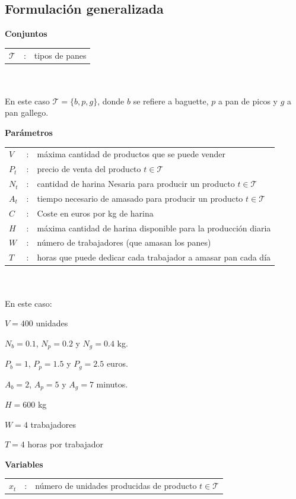 \subsection{Formulación generalizada}

\textbf{Conjuntos}
\

\begin{tabular}{l c l}
    $\mathcal{T}$  & : & tipos de panes \\
\end{tabular}
\\
\\
En este caso $\mathcal{T} = \{b, p, g\}$, donde $b$ se refiere a baguette, $p$ a pan de picos y $g$ a pan gallego.

\textbf{Parámetros}

\begin{tabular}{l c l}
    $V$  & : & máxima cantidad de productos que se puede vender \\
    $P_t$  & : & precio de venta del producto $t \in \mathcal{T}$ \\
    $N_t$  & : & cantidad de harina Nesaria para producir un producto $t \in \mathcal{T}$ \\
    $A_t$  & : & tiempo necesario de amasado para producir un producto $t \in \mathcal{T}$ \\
    $C$ & : & Coste en euros por kg de harina \\
    $H$ & : & máxima cantidad de harina disponible para la producción diaria \\
    $W$ & : & número de trabajadores (que amasan los panes) \\
    $T$ & : & horas que puede dedicar cada trabajador a amasar pan cada día \\
\end{tabular}
\\
\\
En este caso:

$V = 400$ unidades 

$N_b = 0.1$, $N_p = 0.2$ y $N_g = 0.4$ kg.

$P_b = 1$, $P_p = 1.5$ y $P_g = 2.5$ euros.

$A_b = 2$, $A_p = 5$ y $A_g = 7$ minutos.

$H = 600$ kg

$W = 4$ trabajadores

$T = 4$ horas por trabajador


\textbf{Variables}

\begin{tabular}{l c l}
    $x_t$  & : & número de unidades producidas de producto $t \in \mathcal{T}$\\
\end{tabular}

